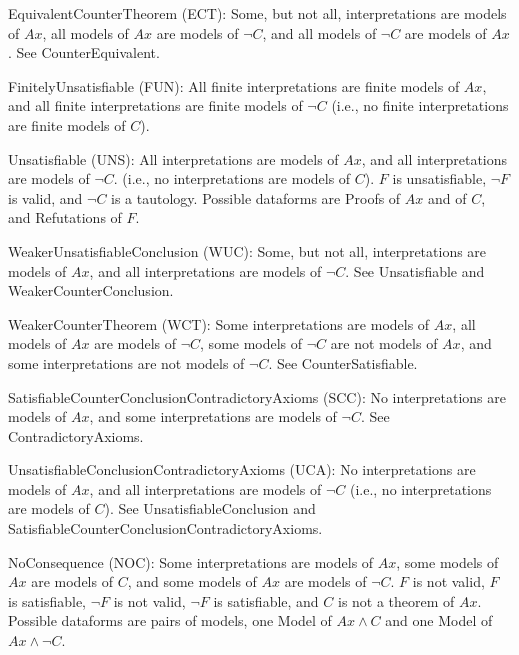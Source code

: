 \documentclass[a4paper]{easychair}
\newenvironment{packed_itemize}{
\vspace*{-0.5em}
\begin{itemize}
  \setlength{\partopsep}{0pt}
  \setlength{\itemsep}{1pt}
  \setlength{\parskip}{0pt}
  \setlength{\parsep}{0pt}
}{\end{itemize}}
\begin{document}
\begin{packed_itemize}
\item EquivalentCounterTheorem (ECT):
      Some, but not all, interpretations are models of $Ax$,
      all models of $Ax$ are models of $\neg C$, and
      all models of $\neg C$ are models of $Ax$.
      See CounterEquivalent.

\item FinitelyUnsatisfiable (FUN):
      All finite interpretations are finite models of $Ax$, and
      all finite interpretations are finite models of $\neg C$
      (i.e., no finite interpretations are finite models of $C$).

\item Unsatisfiable (UNS):
      All interpretations are models of $Ax$, and
      all interpretations are models of $\neg C$.
      (i.e., no interpretations are models of $C$).
      $F$ is unsatisfiable, $\neg F$ is valid, and $\neg C$ is a tautology.
      Possible dataforms are Proofs of $Ax$ and of $C$, and Refutations of $F$.

\item WeakerUnsatisfiableConclusion (WUC):
      Some, but not all, interpretations are models of $Ax$, and
      all interpretations are models of $\neg C$.
      See Unsatisfiable and WeakerCounterConclusion.

\item WeakerCounterTheorem (WCT):
      Some interpretations are models of $Ax$,
      all models of $Ax$ are models of $\neg C$,
      some models of $\neg C$ are not models of $Ax$, and
      some interpretations are not models of $\neg C$.
      See CounterSatisfiable.

\item SatisfiableCounterConclusionContradictoryAxioms (SCC):
      No interpretations are models of $Ax$, and
      some interpretations are models of $\neg C$.
      See ContradictoryAxioms.

\item UnsatisfiableConclusionContradictoryAxioms (UCA):
      No interpretations are models of $Ax$, and
      all interpretations are models of $\neg C$
      (i.e., no interpretations are models of $C$).
      See UnsatisfiableConclusion and 
      SatisfiableCounterConclusionContradictoryAxioms.

\item NoConsequence (NOC):
      Some interpretations are models of $Ax$,
      some models of $Ax$ are models of $C$, and
      some models of $Ax$ are models of $\neg C$.
      $F$ is not valid, $F$ is satisfiable, $\neg F$ is not valid,
      $\neg F$ is satisfiable, and $C$ is not a theorem of $Ax$.
      Possible dataforms are pairs of models, one Model of $Ax \wedge C$
      and one Model of $Ax \wedge \neg C$.

\end{packed_itemize}
\end{document}
